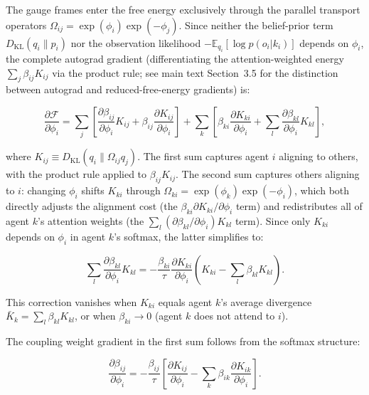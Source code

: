 \documentclass[twoside,11pt]{article}
\begin{document}
The gauge frames enter the free energy exclusively through the parallel transport operators $\Omega_{ij} = \exp(\phi_i)\exp(-\phi_j)$. Since neither the belief-prior term $D_{\mathrm{KL}}(q_i \| p_i)$ nor the observation likelihood $-\mathbb{E}_{q_i}[\log p(o_i | k_i)]$ depends on $\phi_i$, the complete autograd gradient (differentiating the attention-weighted energy $\sum_j \beta_{ij} K_{ij}$ via the product rule; see main text Section~3.5 for the distinction between autograd and reduced-free-energy gradients) is:

\begin{equation}
\frac{\partial \mathcal{F}}{\partial \phi_i}
= \sum_j \left[
\frac{\partial \beta_{ij}}{\partial \phi_i} K_{ij}
+ \beta_{ij} \frac{\partial K_{ij}}{\partial \phi_i}
\right]
+ \sum_k \left[
\beta_{ki} \frac{\partial K_{ki}}{\partial \phi_i}
+ \sum_l \frac{\partial \beta_{kl}}{\partial \phi_i} K_{kl}
\right],
\label{eq:phi_grad_complete}
\end{equation}

where $K_{ij} \equiv D_{\mathrm{KL}}(q_i \| \Omega_{ij} q_j)$. The first sum captures agent $i$ aligning to others, with the product rule applied to $\beta_{ij} K_{ij}$. The second sum captures others aligning to $i$: changing $\phi_i$ shifts $K_{ki}$ through $\Omega_{ki} = \exp(\phi_k)\exp(-\phi_i)$, which both directly adjusts the alignment cost (the $\beta_{ki} \partial K_{ki}/\partial \phi_i$ term) and redistributes all of agent $k$'s attention weights (the $\sum_l (\partial \beta_{kl}/\partial \phi_i) K_{kl}$ term). Since only $K_{ki}$ depends on $\phi_i$ in agent $k$'s softmax, the latter simplifies to:

\begin{equation}
\sum_l \frac{\partial \beta_{kl}}{\partial \phi_i} K_{kl}
= -\frac{\beta_{ki}}{\tau}\frac{\partial K_{ki}}{\partial \phi_i}
\left(K_{ki} - \sum_l \beta_{kl} K_{kl}\right).
\label{eq:reverse_beta_grad_phi}
\end{equation}

This correction vanishes when $K_{ki}$ equals agent $k$'s average divergence $\bar{K}_k = \sum_l \beta_{kl} K_{kl}$, or when $\beta_{ki} \to 0$ (agent $k$ does not attend to $i$).

The coupling weight gradient in the first sum follows from the softmax structure:

\begin{equation}
\frac{\partial \beta_{ij}}{\partial \phi_i} = -\frac{\beta_{ij}}{\tau}\left[
\frac{\partial K_{ij}}{\partial \phi_i} - \sum_k \beta_{ik} \frac{\partial K_{ik}}{\partial \phi_i}
\right].
\label{eq:beta_grad_phi}
\end{equation}
\end{document}
